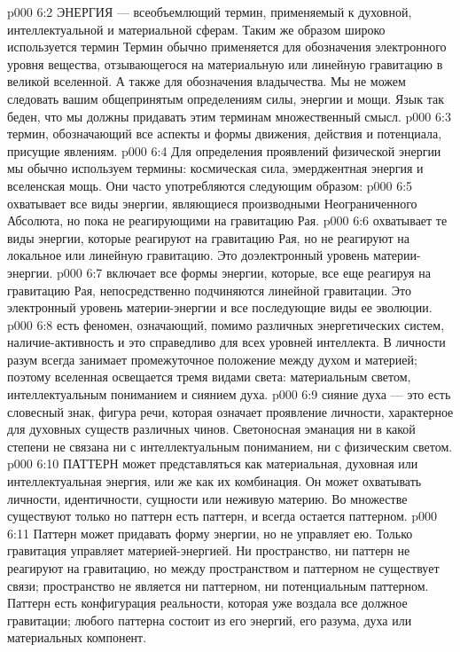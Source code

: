 \vs p000 6:2 \pc ЭНЕРГИЯ --- всеобъемлющий термин, применяемый к духовной, интеллектуальной и материальной сферам. Таким же образом широко используется термин  Термин  обычно применяется для обозначения электронного уровня вещества, отзывающегося на материальную или линейную гравитацию в великой вселенной. А также для обозначения владычества. Мы не можем следовать вашим общепринятым определениям силы, энергии и мощи. Язык так беден, что мы должны придавать этим терминам множественный смысл.
\vs p000 6:3 \pc {} термин, обозначающий все аспекты и формы движения, действия и потенциала, присущие явлениям.
\vs p000 6:4 Для определения проявлений физической энергии мы обычно используем термины: космическая сила, эмерджентная энергия и вселенская мощь. Они часто употребляются следующим образом:
\vs p000 6:5 \bibnobreakspace {} охватывает все виды энергии, являющиеся производными Неограниченного Абсолюта, но пока не реагирующими на гравитацию Рая.
\vs p000 6:6 \bibnobreakspace {} охватывает те виды энергии, которые реагируют на гравитацию Рая, но не реагируют на локальное или линейную гравитацию. Это доэлектронный уровень материи\hyp{}энергии.
\vs p000 6:7 \bibnobreakspace {} включает все формы энергии, которые, все еще реагируя на гравитацию Рая, непосредственно подчиняются линейной гравитации. Это электронный уровень материи\hyp{}энергии и все последующие виды ее эволюции.
\vs p000 6:8 \pc {} есть феномен, означающий, помимо различных энергетических систем, наличие\hyp{}активность  и это справедливо для всех уровней интеллекта. В личности разум всегда занимает промежуточное положение между духом и материей; поэтому вселенная освещается тремя видами света: материальным светом, интеллектуальным пониманием и сиянием духа.
\vs p000 6:9 \pc {} сияние духа --- это есть словесный знак, фигура речи, которая означает проявление личности, характерное для духовных существ различных чинов. Светоносная эманация ни в какой степени не связана ни с интеллектуальным пониманием, ни с физическим светом.
\vs p000 6:10 \pc ПАТТЕРН может представляться как материальная, духовная или интеллектуальная энергия, или же как их комбинация. Он может охватывать личности, идентичности, сущности или неживую материю. Во множестве существуют только  но паттерн есть паттерн, и всегда остается паттерном.
\vs p000 6:11 Паттерн может придавать форму энергии, но не управляет ею. Только гравитация управляет материей\hyp{}энергией. Ни пространство, ни паттерн не реагируют на гравитацию, но между пространством и паттерном не существует связи; пространство не является ни паттерном, ни потенциальным паттерном. Паттерн есть конфигурация реальности, которая уже воздала все должное гравитации;  любого паттерна состоит из его энергий, его разума, духа или материальных компонент.
